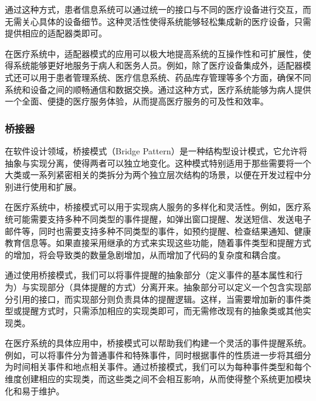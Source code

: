 通过这种方式，患者信息系统可以通过统一的接口与不同的医疗设备进行交互，而无需关心具体的设备细节。这种灵活性使得系统能够轻松集成新的医疗设备，只需提供相应的适配器类即可。

在医疗系统中，适配器模式的应用可以极大地提高系统的互操作性和可扩展性，使得系统能够更好地服务于病人和医务人员。例如，除了医疗设备集成外，适配器模式还可以用于患者管理系统、医疗信息系统、药品库存管理等多个方面，确保不同系统和设备之间的顺畅通信和数据交换。通过这种方式，医疗系统能够为病人提供一个全面、便捷的医疗服务体验，从而提高医疗服务的可及性和效率。


\subsubsection{桥接器}


在软件设计领域，桥接模式（Bridge Pattern）是一种结构型设计模式，它允许将抽象与实现分离，使得两者可以独立地变化。这种模式特别适用于那些需要将一个大类或一系列紧密相关的类拆分为两个独立层次结构的场景，以便在开发过程中分别进行使用和扩展。

在医疗系统中，桥接模式可以用于实现病人服务的多样化和灵活性。例如，医疗系统可能需要支持多种不同类型的事件提醒，如弹出窗口提醒、发送短信、发送电子邮件等，同时也需要支持多种不同类型的事件，如预约提醒、检查结果通知、健康教育信息等。如果直接采用继承的方式来实现这些功能，随着事件类型和提醒方式的增加，将会导致类的数量急剧增加，从而增加了代码的复杂度和耦合度。

通过使用桥接模式，我们可以将事件提醒的抽象部分（定义事件的基本属性和行为）与实现部分（具体提醒的方式）分离开来。抽象部分可以定义一个包含实现部分引用的接口，而实现部分则负责具体的提醒逻辑。这样，当需要增加新的事件类型或提醒方式时，只需添加相应的实现类即可，而无需修改现有的抽象类或其他实现类。

在医疗系统的具体应用中，桥接模式可以帮助我们构建一个灵活的事件提醒系统。例如，可以将事件分为普通事件和特殊事件，同时根据事件的性质进一步将其细分为时间相关事件和地点相关事件。通过桥接模式，我们可以为每种事件类型和每个维度创建相应的实现类，而这些类之间不会相互影响，从而使得整个系统更加模块化和易于维护。

